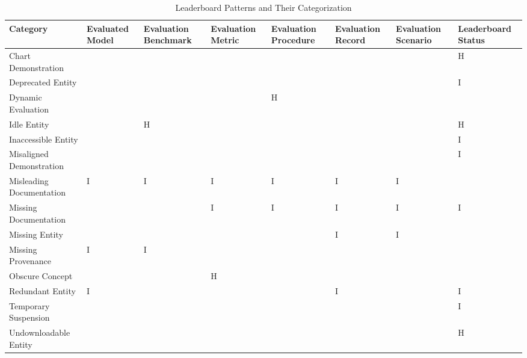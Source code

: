 \begin{table}
\caption{Leaderboard Patterns and Their Categorization}
\label{tab:pattern}
\begin{tabular}{llllllll}
\toprule
Category & Evaluated Model & Evaluation Benchmark & Evaluation Metric & Evaluation Procedure & Evaluation Record & Evaluation Scenario & Leaderboard Status \\
\midrule
Chart Demonstration &  &  &  &  &  &  & H \\
Deprecated Entity &  &  &  &  &  &  & I \\
Dynamic Evaluation &  &  &  & H &  &  &  \\
Idle Entity &  & H &  &  &  &  & H \\
Inaccessible Entity &  &  &  &  &  &  & I \\
Misaligned Demonstration &  &  &  &  &  &  & I \\
Misleading Documentation & I & I & I & I & I & I &  \\
Missing Documentation &  &  & I & I & I & I & I \\
Missing Entity &  &  &  &  & I & I &  \\
Missing Provenance & I & I &  &  &  &  &  \\
Obscure Concept &  &  & H &  &  &  &  \\
Redundant Entity & I &  &  &  & I &  & I \\
Temporary Suspension &  &  &  &  &  &  & I \\
Undownloadable Entity &  &  &  &  &  &  & H \\
\bottomrule
\end{tabular}
\end{table}
